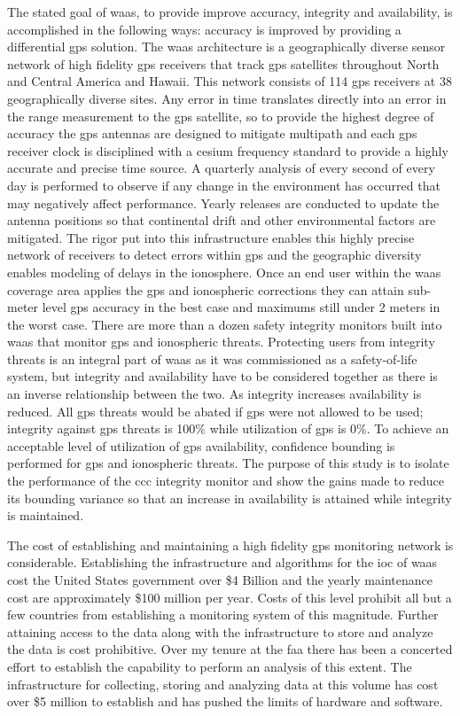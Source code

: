 The stated goal of \ac{waas}, to provide improve accuracy, integrity and availability, is accomplished in the following ways: accuracy is improved by providing a differential \ac{gps} solution. The \ac{waas} architecture is a geographically diverse sensor network of high fidelity \ac{gps} receivers that track \ac{gps} satellites throughout North and Central America and Hawaii. This network consists of 114 \ac{gps} receivers at 38 geographically diverse sites.  Any error in time translates directly into an error in the range measurement to the \ac{gps} satellite, so to provide the highest degree of accuracy the \ac{gps} antennas are designed to mitigate multipath and each \ac{gps} receiver clock is disciplined with a cesium frequency standard to provide a highly accurate and precise time source. A quarterly analysis of every second of every day is performed to observe if any change in the environment has occurred that may negatively affect performance. Yearly releases are conducted to update the antenna positions so that continental drift and other environmental factors are mitigated. The rigor put into this infrastructure enables this highly precise network of receivers to detect errors within \ac{gps} and the geographic diversity enables modeling of delays in the ionosphere. Once an end user within the \ac{waas} coverage area applies the \ac{gps} and ionospheric corrections they can attain sub-meter level \ac{gps} accuracy in the best case and maximums still under 2 meters in the worst case. There are more than a dozen safety integrity monitors built into \ac{waas} that monitor \ac{gps} and ionospheric threats. Protecting users from integrity threats is an integral part of \ac{waas} as it was commissioned as a safety-of-life system, but integrity and availability have to be considered together as there is an inverse relationship between the two. As integrity increases availability is reduced. All \ac{gps} threats would be abated if \ac{gps} were not allowed to be used; integrity against \ac{gps} threats is 100\% while utilization of \ac{gps} is 0\%.  To achieve an acceptable level of utilization of \ac{gps} availability, confidence bounding is performed for \ac{gps} and ionospheric threats. The purpose of this study is to isolate the performance of the \ac{ccc} integrity monitor and show the gains made to reduce its bounding variance so that an increase in availability is attained while integrity is maintained.

The cost of establishing and maintaining a high fidelity \ac{gps} monitoring network is considerable. Establishing the infrastructure and algorithms for the \ac{ioc} of \ac{waas} cost the United States government over \$4 Billion and the yearly maintenance cost are approximately \$100 million per year. Costs of this level prohibit all but a few countries from establishing a monitoring system of this magnitude. Further attaining access to the data along with the infrastructure to store and analyze the data is cost prohibitive. Over my tenure at the \ac{faa} there has been a concerted effort to establish the capability to perform an analysis of this extent. The infrastructure for collecting, storing and analyzing data at this volume has cost over \$5 million to establish and has pushed the limits of hardware and software.

